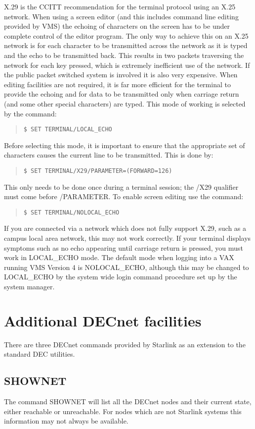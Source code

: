 X.29 is the CCITT recommendation for the terminal protocol using an X.25
network.
When using a screen editor (and this includes command line editing provided by
VMS) the echoing of characters on the screen has to be under complete control
of the editor program.
The only way to achieve this on an X.25 network is for each character to be
transmitted across the network as it is typed and the echo to be transmitted
back.
This results in two packets traversing the network for each key pressed, which is
extremely inefficient use of the network.
If the public packet switched system is involved it is also very expensive.
When editing facilities are not required, it is far more efficient for the
terminal to provide the echoing and for data to be transmitted only when
carriage return (and some other special characters) are typed.
This mode of working is selected by the command:
\begin{quote}
{\tt \$ SET TERMINAL/LOCAL\_ECHO}
\end{quote}
Before selecting this mode, it is important to ensure that the appropriate set
of characters causes the current line to be transmitted.
This is done by:
\begin{quote}
{\tt \$ SET TERMINAL/X29/PARAMETER=(FORWARD=126)}
\end{quote}
This only needs to be done once during a terminal session; the /X29 qualifier
must come before /PARAMETER.
To enable screen editing use the command:
\begin{quote}
{\tt \$ SET TERMINAL/NOLOCAL\_ECHO}
\end{quote}
If you are connected via a network which does not fully support X.29, such as a
campus local area network, this may not work correctly.
If your terminal displays symptoms such as no echo appearing until carriage
return is pressed, you must work in LOCAL\_ECHO mode.
The default mode when logging into a VAX running VMS Version 4 is NOLOCAL\_ECHO,
although this may be changed to LOCAL\_ECHO by the system wide login command
procedure set up by the system manager.

\section{Additional DECnet facilities}
\label{shownet}

There are three DECnet commands provided by Starlink as an extension to
the standard DEC utilities.
\subsection{SHOWNET}
The command SHOWNET will list all the DECnet nodes and their current state,
either reachable or unreachable.
For nodes which are not Starlink systems this information may not always be
available.
